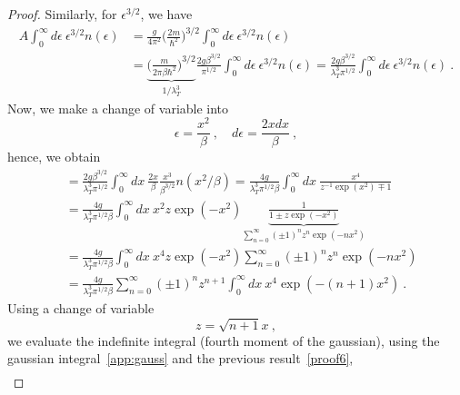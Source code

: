 \begin{proof}
        Similarly, for $\epsilon^{3/2}$, we have 
        \begin{equation*}
        \begin{aligned}
            A \int_0^\infty d\epsilon ~ \epsilon^{3/2} n(\epsilon) & = \frac{g}{4 \pi^2} \Big(\frac{2m}{\hbar^2} \Big)^{3/2} \int_0^\infty d\epsilon ~ \epsilon^{3/2} n(\epsilon) \\ & = \underbrace{\Big ( \frac{m}{2 \pi \beta \hbar^2} \Big)^{3/2}}_{1 / \lambda_T^3} \frac{2 g \beta^{3/2}}{\pi^{1/2}} \int_0^\infty d\epsilon ~ \epsilon^{3/2} n(\epsilon)  = \frac{2 g \beta^{3/2}}{\lambda_T^3 \pi^{1/2}} \int_0^\infty d\epsilon ~ \epsilon^{3/2} n(\epsilon) ~.
        \end{aligned}
        \end{equation*}
        Now, we make a change of variable into
        \begin{equation*}
            \epsilon = \frac{x^2}{\beta} ~, \quad d \epsilon = \frac{2 x dx}{\beta} ~,
        \end{equation*}
        hence, we obtain 
        \begin{equation*}
        \begin{aligned}
            & = \frac{2 g \beta^{3/2}}{\lambda_T^3 \pi^{1/2}} \int_0^\infty dx ~ \frac{2 x}{\beta} \frac{x^3}{\beta^{3/2}} n(x^2 / \beta) = \frac{4 g}{\lambda_T^3 \pi^{1/2} \beta} \int_0^\infty dx ~ \frac{x^4}{z^{-1} \exp(x^2) \mp 1} \\ & = \frac{4 g}{\lambda_T^3 \pi^{1/2} \beta} \int_0^\infty dx ~ x^2 z \exp(-x^2) \underbrace{\frac{1}{1 \pm z \exp(-x^2)}}_{\sum_{n=0}^\infty (\pm 1)^n z^n \exp(-n x^2)} \\ & = \frac{4 g}{\lambda_T^3 \pi^{1/2} \beta} \int_0^\infty dx ~ x^4 z \exp(-x^2) \sum_{n=0}^\infty (\pm 1)^n z^n \exp(-n x^2) \\ & = \frac{4 g}{\lambda_T^3 \pi^{1/2} \beta} \sum_{n=0}^\infty (\pm 1)^n z^{n+1} \int_0^\infty dx ~ x^4 \exp(-(n + 1) x^2) ~.
        \end{aligned}
        \end{equation*}
        Using a change of variable 
        \begin{equation*}
            z = \sqrt{n+1} x ~,
        \end{equation*}
        we evaluate the indefinite integral (fourth moment of the gaussian), using the gaussian integral~\eqref{app:gauss} and the previous result~\eqref{proof6},
        \begin{equation*}
        \begin{aligned}

\end{aligned}
\end{equation*}
\end{proof}
